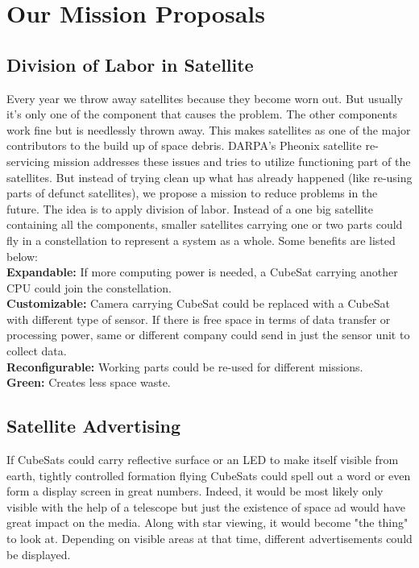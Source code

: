 \section{Our Mission Proposals}

\subsection{Division of Labor in Satellite}
Every year we throw away satellites because they become worn out. But usually it's only one of the component that causes the problem. The other components work fine but is needlessly thrown away. This makes satellites as one of the major contributors to the build up of space debris. DARPA's Pheonix satellite re-servicing mission addresses these issues and tries to utilize functioning part of the satellites. But instead of trying clean up what has already happened (like  re-using parts of defunct satellites), we propose a mission to reduce problems in the future. The idea is to apply division of labor. Instead of a one big satellite containing all the components, smaller satellites carrying one or two parts could fly in a constellation to represent a system as a whole. Some benefits are listed below: \\

{\bf Expandable:} If more computing power is needed, a CubeSat carrying another CPU could join the constellation. \\
 
{\bf Customizable:} Camera carrying CubeSat could be replaced with a CubeSat with different type of sensor.
If there is free space in terms of data transfer or processing power, same or different company could send in just the sensor unit to collect data. \\

{\bf Reconfigurable:} Working parts could be re-used for different missions.\\

{\bf Green:} Creates less space waste.

\subsection{Satellite Advertising}
If CubeSats could carry reflective surface or an LED to make itself visible from earth, tightly controlled formation flying CubeSats could spell out a word or even form a display screen in great numbers. Indeed, it would be most likely only visible with the help of a telescope but just the existence of space ad would have great impact on the media. Along with star viewing, it would become "the thing" to look at. Depending on visible areas at that time, different advertisements could be displayed.


